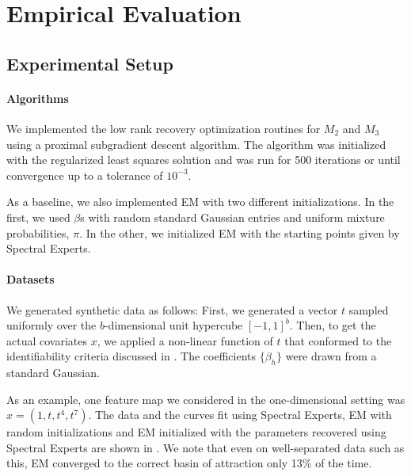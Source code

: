 \section{Empirical Evaluation}
\label{sec:evaluation}

\subsection{Experimental Setup}

\paragraph{Algorithms}

We implemented the low rank recovery optimization routines for $M_2$ and
$M_3$ using a proximal subgradient descent
algorithm.%
The algorithm
was initialized with the regularized least squares solution and was run
for 500 iterations or until convergence up to a tolerance of $10^{-3}$.

As a baseline, we also implemented EM with two different
initializations. In the first, we used $\beta$s with random standard
Gaussian entries and uniform mixture probabilities, $\pi$. In the other,
we initialized EM with the starting points given by Spectral Experts. 

\paragraph{Datasets}

We generated synthetic data as follows:
First, we generated a vector $t$ sampled uniformly over the $b$-dimensional
unit hypercube $[-1,1]^b$.
Then, to get the actual covariates $x$, we applied a non-linear function of $t$
that conformed to the identifiability criteria discussed in
.
The coefficients $\{\beta_h\}$ were drawn from a standard Gaussian.  

As an example, one feature map we considered in the one-dimensional
setting was $x = (1, t, t^4, t^7)$. The data and the curves fit using
Spectral Experts, EM with random initializations and EM initialized with
the parameters recovered using Spectral Experts are shown in
. We note that even on well-separated data such as
this, EM converged to the correct basin of attraction only 13\% of the time.

